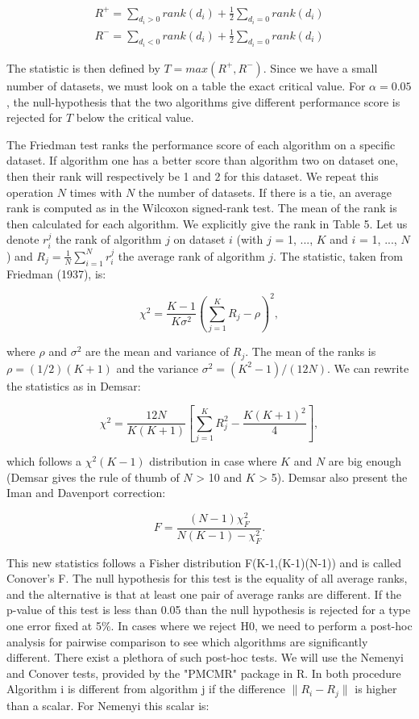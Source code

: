 \documentclass[a4paper,12pt]{article}
\numberwithin{equation}{section}
\begin{document}
\begin{align*}
R^+ = \sum_{d_i>0}rank(d_i)+ \frac{1}{2}\sum_{d_i=0}rank(d_i) \\
R^- = \sum_{d_i<0}rank(d_i)+ \frac{1}{2}\sum_{d_i=0}rank(d_i)
\end{align*}

The statistic is then defined by $T= max(R^+,R^-)$. Since we have a small number of datasets, we must look on a table the exact critical value. For $\alpha = 0.05$, the null-hypothesis that the two algorithms give different performance score is rejected for $T$ below the critical value. 

The Friedman test ranks the performance score of each algorithm on a specific dataset. If algorithm one has a better score than algorithm two on dataset one, then their rank will respectively be 1 and 2 for this dataset. We repeat this operation $N$ times with $N$ the number of datasets. If there is a tie, an average rank is computed as in the Wilcoxon signed-rank test. The mean of the rank is then calculated for each algorithm. We explicitly give the rank in Table 5. Let us denote $r_i^j$ the rank of algorithm $j$ on dataset $i$ (with $j$ = 1, ..., $K$ and $i$ = 1, ..., $N$) and $R_j = \frac{1}{N}\sum_{i=1}^Nr_i^j$ the average rank of algorithm $j$. The statistic, taken from Friedman (1937), is:


\begin{equation*}
\chi^2 = \frac{K-1}{K\sigma^2}(\sum_{j=1}^KR_{j}-\rho)^2,
\end{equation*}

where $\rho$ and $\sigma^2$ are the mean and variance of $R_j$. The mean of the ranks is $ \rho = (1/2) (K+1)$ and the variance $\sigma^2 = (K^2-1)/(12N)$. We can rewrite the statistics as in Demsar:

\begin{equation*}
\chi^2 = \frac{12N}{K(K+1)}[\sum_{j=1}^KR^2_j-\frac{K(K+1)^2}{4}],
\end{equation*}

which follows a $\chi^2(K-1)$ distribution in case where $K$ and $N$ are big enough (Demsar gives the rule of thumb of $N$ > 10 and $K$ > 5). Demsar also present the Iman and Davenport correction:

\begin{equation*}
F = \frac{(N-1)\chi^2_F}{N(K-1)-\chi^2_F}. 
\end{equation*}

This new statistics follows a Fisher distribution F(K-1,(K-1)(N-1)) and is called Conover's F. The null hypothesis for this test is the equality of all average ranks, and the alternative is that at least one pair of average ranks are different. If the p-value of this test is less than 0.05 than the null hypothesis is rejected for a type one error fixed at 5\%. In cases where we reject H0, we need to perform a post-hoc analysis for pairwise comparison to see which algorithms are significantly different. There exist a plethora of such post-hoc tests. We will use the Nemenyi and Conover tests, provided by the "PMCMR" package in R. In both procedure Algorithm i is different from algorithm j if the difference $\|R_i-R_j\|$ is higher than a scalar. For Nemenyi this scalar is:
\end{document}
